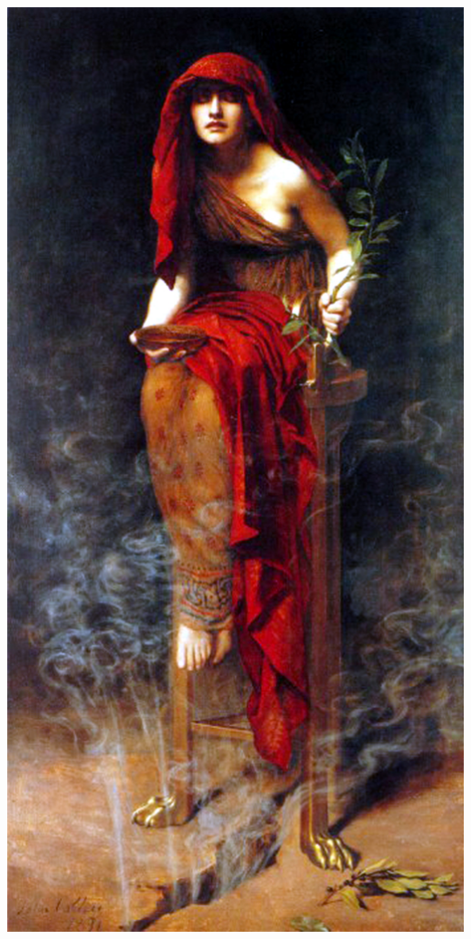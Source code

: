 \documentclass{beamer}
\begin{document}
\begin{frame}
\begin{columns}{}
\begin{column}{0.25\textwidth}
\begin{block}{}
                \includegraphics[width=\hsize]{art/priestess_of_delphi.jpg}
            \end{block}
        \end{column}
    \end{columns}
\end{frame}
\end{document}
